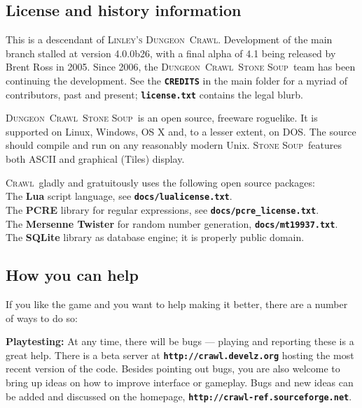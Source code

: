 \documentclass[a4paper,10pt]{article}
\newcommand{\key}[1]{{{\texttt{\textbf{#1}}}}} %
\newcommand{\crawl}{\textsc{Crawl}}
\newcommand{\dungeon}{\textsc{Dungeon}}
\newcommand{\soup}{\textsc{Stone Soup}}
\newcommand{\para}{\vspace{1.5ex}}
\begin{document}
\subsection*{License and history information}

This is a descendant of \textsc{Linley's} \dungeon\ \crawl. 
Development of the main branch stalled at version 4.0.0b26, with a final 
alpha of 4.1 being released by Brent Ross in 2005. Since 2006, the 
\dungeon\ \crawl\ \soup\ team has been continuing the 
development. See the \key{CREDITS} in the main folder for a myriad of 
contributors, past and present; \key{license.txt} contains the legal blurb.

\dungeon\ \crawl\ \soup\ is an open source, freeware roguelike. It is 
supported on Linux, Windows, OS X  and, to a lesser extent, on DOS. The 
source should compile and run on any reasonably modern Unix. \soup\ 
features both ASCII and graphical (Tiles) display.

\crawl\ gladly and gratuitously uses the following open source packages: \\
The \textbf{Lua} script language, see \key{docs/lualicense.txt}.\\
The \textbf{PCRE} library for regular expressions, see 
    \key{docs/pcre\_license.txt}.\\
The \textbf{Mersenne Twister} for random number generation, 
    \key{docs/mt19937.txt}.\\
The \textbf{SQLite} library as database engine; it is properly public domain.\\

\subsection*{How you can help}

If you like the game and you want to help making it better, there are a number 
of ways to do so:

\para

\textbf{Playtesting:}
At any time, there will be bugs --- playing and reporting these is a great 
help. There is a beta server at \key{http://crawl.develz.org} hosting the most 
recent version of the code. Besides pointing out bugs, you are also welcome to
bring up ideas on how to improve interface or gameplay. Bugs and new ideas can 
be added and discussed on the homepage, \key{http://crawl-ref.sourceforge.net}.

\para
\end{document}
